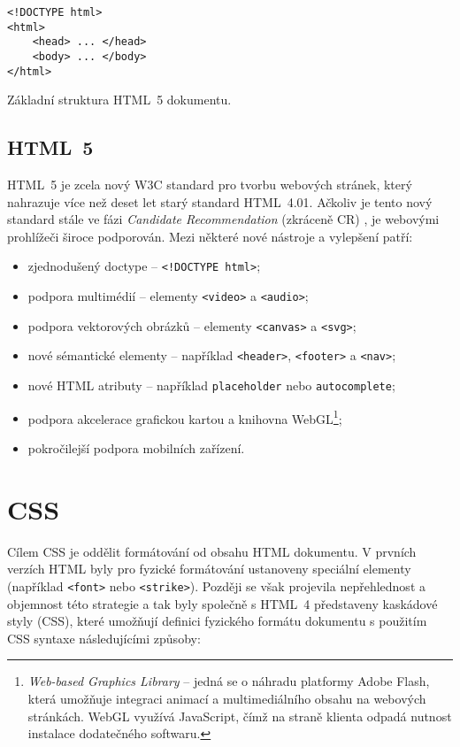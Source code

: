 \begin{example}
    \centering
    \begin{lstlisting}
<!DOCTYPE html>
<html>
    <head> ... </head>
    <body> ... </body>
</html>
    \end{lstlisting}
    \caption{Základní struktura HTML~5 dokumentu.}
    \label{example:html}
\end{example}

\subsection{HTML~5}

HTML~5 je zcela nový W3C standard pro tvorbu webových stránek, který nahrazuje více než deset let starý standard HTML~4.01. Ačkoliv je tento nový standard stále ve fázi \textit{Candidate Recommendation} (zkráceně CR) \cite{17}, je webovými prohlížeči široce podporován. Mezi některé nové nástroje a vylepšení patří:

\begin{itemize}
    \item zjednodušený doctype -- \texttt{<!DOCTYPE html>};
    \item podpora multimédií -- elementy \texttt{<video>} a \texttt{<audio>};
    \item podpora vektorových obrázků -- elementy \texttt{<canvas>} a \texttt{<svg>};
    \item nové sémantické elementy -- například \texttt{<header>}, \texttt{<footer>} a \texttt{<nav>};
    \item nové HTML atributy -- například \texttt{placeholder} nebo \texttt{autocomplete};
    \item podpora akcelerace grafickou kartou a knihovna WebGL\footnote{\textit{Web-based Graphics Library} -- jedná se o náhradu platformy Adobe Flash, která umožňuje integraci animací a multimediálního obsahu na webových stránkách. WebGL využívá JavaScript, čímž na straně klienta odpadá nutnost instalace dodatečného softwaru.};
    \item pokročilejší podpora mobilních zařízení.
\end{itemize}

\section{CSS}
\label{sec:css}

Cílem CSS je oddělit formátování od obsahu HTML dokumentu. V prvních verzích HTML byly pro fyzické formátování ustanoveny speciální elementy (například \texttt{<font>} nebo \texttt{<strike>}). Později se však projevila nepřehlednost a objemnost této strategie a tak byly společně s HTML~4 představeny kaskádové styly (CSS), které umožňují definici fyzického formátu dokumentu s použitím CSS syntaxe následujícími způsoby:

